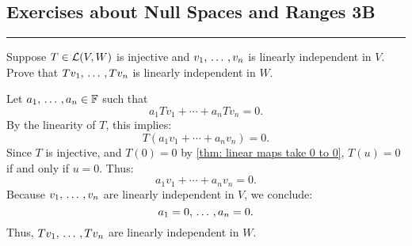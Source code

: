 \subsection*{Exercises about Null Spaces and Ranges 3B}
\hrule
\phantom{.}

\setcounter{xrcs}{8}
%

\setcounter{xrcs}{7}
\begin{xrcs} %
  Suppose $T \in \mathcal{L}(V,W)$ is injective and $v_1, {\, \ldots \,\,}, v_n$ is linearly independent in $V$. Prove that $Tv_1, {\, \ldots \,\,}, Tv_n$ is linearly independent in $W$.
\end{xrcs}
\begin{prf}
  Let $a_1, {\, \ldots \,\,}, a_n \in \mathbb{F}$ such that
  \[
  a_1 Tv_1 + \cdots + a_n Tv_n = 0.
  \]
  By the linearity of $T$, this implies:
  \[
  T(a_1 v_1 + \cdots + a_n v_n) = 0.
  \]
  Since $T$ is injective, and $T(0)=0$ by \ref{thm: linear maps take 0 to 0}, \( T(u) = 0 \) if and only if \( u = 0 \). Thus:
  \[
  a_1 v_1 + \cdots + a_n v_n = 0.
  \]
  Because $v_1, {\, \ldots \,\,}, v_n$ are linearly independent in $V$, we conclude:
  \[
  a_1 = 0, {\, \ldots \,\,}, a_n = 0.
  \]
  Thus, $Tv_1, {\, \ldots \,\,}, Tv_n$ are linearly independent in $W$.
\end{prf}

